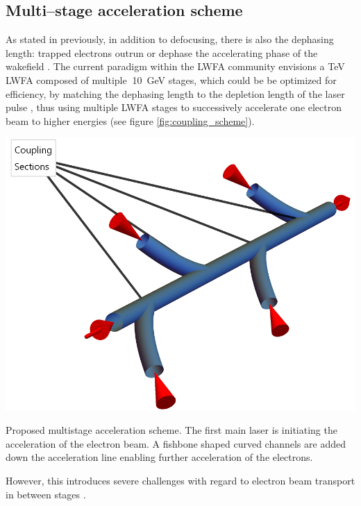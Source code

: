 \documentclass[../main.tex]{subfiles}
\begin{document}



\subsection{Multi--stage acceleration scheme}

As stated in previously, in addition to defocusing, there is also the dephasing length: trapped electrons outrun or dephase the accelerating phase of the wakefield \cite{Esarey2009PhysicsAccelerators}. The current paradigm within the LWFA community envisions a \si{\TeV} LWFA composed of multiple $~$\SI{10}{\GeV} stages, which could be be optimized for efficiency, by matching the dephasing length to the depletion length of the laser pulse \cite{Schroeder2010PhysicsColliders}, thus using multiple LWFA stages to successively accelerate one electron beam to higher energies (see figure \ref{fig:coupling_scheme}).
\begin{marginfigure}
\includegraphics[width=\marginparwidth]{figures/cad/coupling_scheme.png}
\caption{Proposed multistage acceleration scheme. The first main laser is initiating the acceleration of the electron beam. A fishbone shaped curved channels are added down the acceleration line enabling further acceleration of the electrons.}
\label{fig:coupling_scheme}
\end{marginfigure}
However, this introduces severe challenges with regard to electron beam transport in between stages \cite{Esarey2009PhysicsAccelerators}.
\end{document}
